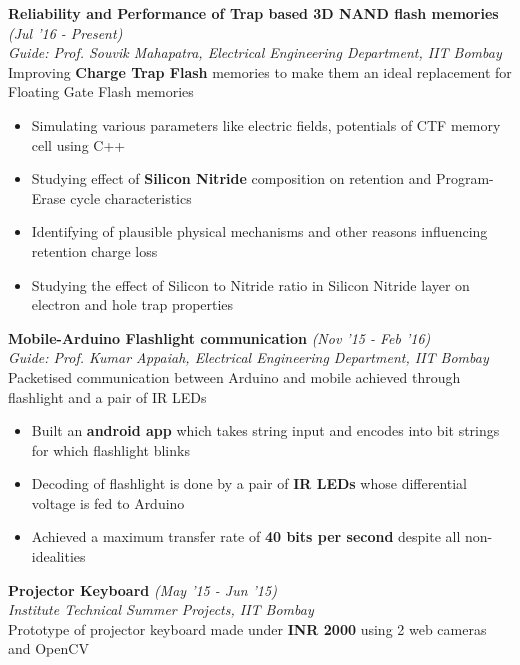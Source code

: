 \documentclass[10.99pt]{article}
\begin{document}
\textbf{Reliability and Performance of Trap based 3D NAND flash memories } \hfill{\sl \small (Jul '16 - Present)}\\
{\it Guide: Prof. Souvik Mahapatra, Electrical Engineering Department, IIT Bombay}\hfill{}\\
Improving {\bf Charge Trap Flash} memories to make them an ideal replacement for Floating Gate Flash memories\\ 
\vspace{-16pt}
\begin{itemize}[itemsep = -0.75 mm, leftmargin=*]
    \item Simulating various parameters like electric fields, potentials of CTF memory cell using C++
    \item Studying effect of {\bf Silicon Nitride} composition on retention and Program-Erase cycle characteristics
    \item Identifying of plausible physical mechanisms and other reasons influencing retention charge loss
    \item Studying the effect of Silicon to Nitride ratio in Silicon Nitride layer on electron and hole trap properties
\end{itemize}
\textbf{Mobile-Arduino Flashlight communication} \hfill{\sl \small (Nov '15 - Feb '16)}\\
{\it Guide: Prof. Kumar Appaiah, Electrical Engineering Department, IIT Bombay}\hfill{}\\
Packetised communication between Arduino and mobile achieved through flashlight and a pair of IR LEDs\\
\vspace{-16pt} 
\begin{itemize}[itemsep = -0.75 mm, leftmargin=*]
    \item Built an {\bf android app} which takes string input and encodes into bit strings for which flashlight blinks
    \item Decoding of flashlight is done by a pair of {\bf IR LEDs} whose differential voltage is fed to Arduino
    \item Achieved a maximum transfer rate of {\bf 40 bits per second} despite all non-idealities
\end{itemize} 
\vspace{3pt}
\textbf{Projector Keyboard} \hfill{\sl \small (May '15 - Jun '15)}\\%
{\it Institute Technical Summer Projects, IIT Bombay}\\
Prototype of projector keyboard made under {\bf INR 2000} using 2 web cameras and OpenCV\\
\end{document}
